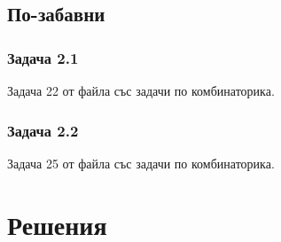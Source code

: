 \documentclass[12pt]{article}
\begin{document}
\subsection*{По-забавни}
\subsubsection*{Задача 2.1}
Задача 22 от файла със задачи по комбинаторика.
\subsubsection*{Задача 2.2}
Задача 25 от файла със задачи по комбинаторика.


\section*{Решения}
\end{document}

